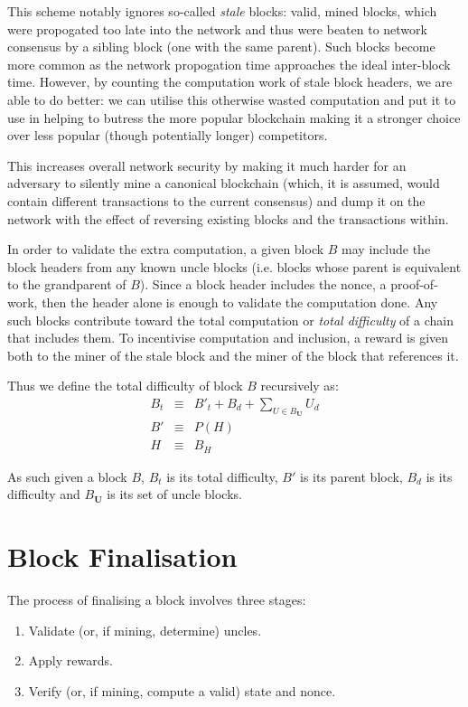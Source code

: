 \documentclass[9pt,oneside]{amsart}
\begin{document}
\begin{multicols}{2}
This scheme notably ignores so-called \textit{stale} blocks: valid, mined blocks, which were propogated too late into the network and thus were beaten to network consensus by a sibling block (one with the same parent). Such blocks become more common as the network propogation time approaches the ideal inter-block time. However, by counting the computation work of stale block headers, we are able to do better: we can utilise this otherwise wasted computation and put it to use in helping to butress the more popular blockchain making it a stronger choice over less popular (though potentially longer) competitors.

This increases overall network security by making it much harder for an adversary to silently mine a canonical blockchain (which, it is assumed, would contain different transactions to the current consensus) and dump it on the network with the effect of reversing existing blocks and the transactions within.

In order to validate the extra computation, a given block $B$ may include the block headers from any known uncle blocks (i.e. blocks whose parent is equivalent to the grandparent of $B$). Since a block header includes the nonce, a proof-of-work, then the header alone is enough to validate the computation done. Any such blocks contribute toward the total computation or \textit{total difficulty} of a chain that includes them. To incentivise computation and inclusion, a reward is given both to the miner of the stale block and the miner of the block that references it.

Thus we define the total difficulty of block $B$ recursively as:
\begin{eqnarray}
B_t & \equiv & B'_t + B_d + \sum\limits_{U \in B_\mathbf{U}} U_d \\
B' & \equiv & P(H) \\
H & \equiv & B_H
\end{eqnarray}

As such given a block $B$, $B_t$ is its total difficulty, $B'$ is its parent block, $B_d$ is its difficulty and $B_\mathbf{U}$ is its set of uncle blocks.

\section{Block Finalisation} \label{ch:finalisation}

The process of finalising a block involves three stages:

\begin{enumerate}
\item Validate (or, if mining, determine) uncles.
\item Apply rewards.
\item Verify (or, if mining, compute a valid) state and nonce.
\end{enumerate}


\end{multicols}
\end{document}
